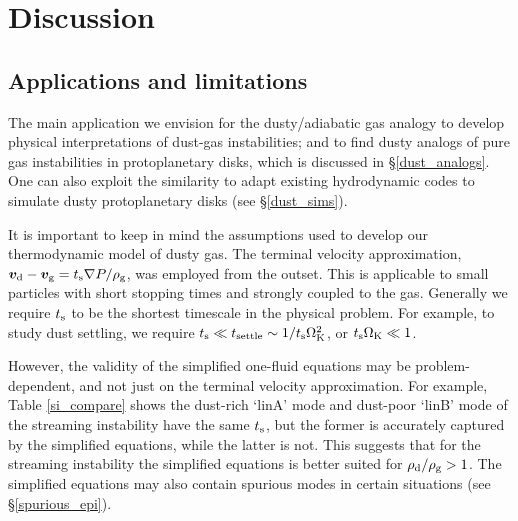 \section{Discussion}\label{discussion}


{\bf


\subsection{Applications and limitations}

The main application we envision for the dusty/adiabatic gas analogy 
to develop physical interpretations of dust-gas instabilities; and to find 
dusty analogs of pure gas instabilities in protoplanetary disks, 
which is discussed in \S\ref{dust_analogs}. One can also exploit the similarity to adapt existing
hydrodynamic codes to simulate dusty protoplanetary disks (see \S\ref{dust_sims}). 

It is important to keep in mind the assumptions 
used to develop our thermodynamic model of dusty gas. 
The terminal velocity approximation, $\bm{v}_\mathrm{d} -
\bm{v}_\mathrm{g} = t_\mathrm{s} \nabla P /\rho_\mathrm{g}$, was employed from the
outset. 
This is applicable to small particles with short stopping times and
strongly coupled to the gas. Generally we require $t_\mathrm{s}$ to be the
shortest timescale in the physical problem. For  
example, to study dust settling, we require $t_\mathrm{s} \ll
t_\mathrm{settle}\sim 1/t_\mathrm{s}\Omega_{\rm K}^2$, or 
$t_\mathrm{s}\Omega_{\rm K} \ll 1$. 

However, the validity of the simplified one-fluid equations may be
problem-dependent, and not just on the terminal velocity 
approximation. For example, Table \ref{si_compare} shows the dust-rich
`linA' mode and dust-poor `linB' mode of the streaming instability
have the same $t_\mathrm{s}$, but the former is accurately captured by the
simplified equations, while the latter is not.  This suggests that for
the streaming instability the simplified equations is better suited
for $\rho_\mathrm{d}/\rho_\mathrm{g}>1$. The simplified equations may also contain spurious
modes in certain situations (see \S\ref{spurious_epi}). 


}
